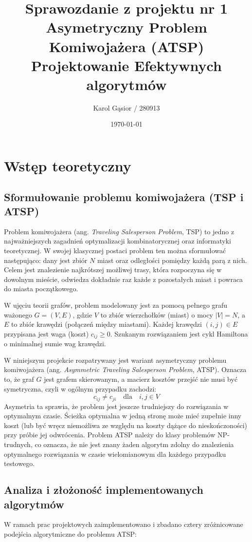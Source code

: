\documentclass[12pt, a4paper]{article}
\title{\textbf{Sprawozdanie z projektu nr 1} \\ \large Asymetryczny Problem Komiwojażera (ATSP)
\\ \large Projektowanie Efektywnych algorytmów}
\author{Karol Gąsior / 280913}
\date{\today}
\begin{document}
	
	\maketitle %
	\newpage
	\tableofcontents %
	\newpage
	
	\section{Wstęp teoretyczny}
	
	\subsection{Sformułowanie problemu komiwojażera (TSP i ATSP)}
	Problem komiwojażera (ang. \textit{Traveling Salesperson Problem}, TSP) to jedno z najważniejszych zagadnień optymalizacji kombinatorycznej oraz informatyki teoretycznej. W swojej klasycznej postaci problem ten można sformułować następująco: dany jest zbiór $N$ miast oraz odległości pomiędzy każdą parą z nich. Celem jest znalezienie najkrótszej możliwej trasy, która rozpoczyna się w dowolnym mieście, odwiedza dokładnie raz każde z pozostałych miast i powraca do miasta początkowego.
	
	W ujęciu teorii grafów, problem modelowany jest za pomocą pełnego grafu ważonego $G = (V, E)$, gdzie $V$ to zbiór wierzchołków (miast) o mocy $|V| = N$, a $E$ to zbiór krawędzi (połączeń między miastami). Każdej krawędzi $(i, j) \in E$ przypisana jest waga (koszt) $c_{ij} \geq 0$. Szukanym rozwiązaniem jest cykl Hamiltona o minimalnej sumie wag krawędzi.
	
	W niniejszym projekcie rozpatrywany jest wariant asymetryczny problemu komiwojażera (ang. \textit{Asymmetric Traveling Salesperson Problem}, ATSP). Oznacza to, że graf $G$ jest grafem skierowanym, a macierz kosztów przejść nie musi być symetryczna, czyli w ogólnym przypadku zachodzi:
	$$ c_{ij} \neq c_{ji} \quad \text{dla} \quad i, j \in V $$
	Asymetria ta sprawia, że problem jest jeszcze trudniejszy do rozwiązania w optymalnym czasie. Ścieżka optymalna w jedną stronę może mieć zupełnie inny koszt (lub być wręcz niemożliwa ze względu na koszty dążące do nieskończoności) przy próbie jej odwrócenia. Problem ATSP należy do klasy problemów NP-trudnych, co oznacza, że nie jest znany żaden algorytm zdolny do znalezienia optymalnego rozwiązania w czasie wielomianowym dla każdego przypadku testowego.
	
	\subsection{Analiza i złożoność implementowanych algorytmów}
	W ramach prac projektowych zaimplementowano i zbadano cztery zróżnicowane podejścia algorytmiczne do problemu ATSP:
	
\end{document}
